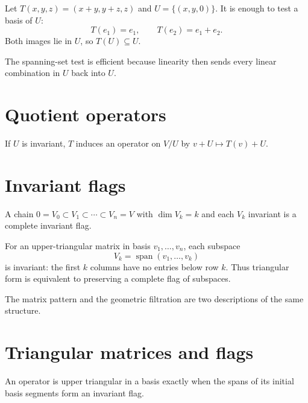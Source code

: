 \begin{example}\label{ex:i10-expand-01}
Let \(T(x,y,z)=(x+y,y+z,z)\) and
\(U=\{(x,y,0)\}\). It is enough to test a basis of \(U\):
\[
T(e_1)=e_1,\qquad T(e_2)=e_1+e_2.
\]
Both images lie in \(U\), so \(T(U)\subseteq U\).

The spanning-set test is efficient because linearity then sends every linear
combination in \(U\) back into \(U\).
\end{example}
\section{Quotient operators}
If $U$ is invariant, $T$ induces an operator on $V/U$ by $v+U\mapsto T(v)+U$.

\section{Invariant flags}
A chain $0=V_0\subset V_1\subset\cdots\subset V_n=V$ with $\dim V_k=k$ and each $V_k$ invariant is a complete invariant flag.


\begin{example}\label{ex:i10-expand-03}
For an upper-triangular matrix in basis \(v_1,\ldots,v_n\), each subspace
\[
V_k=\operatorname{span}(v_1,\ldots,v_k)
\]
is invariant: the first \(k\) columns have no entries below row \(k\).
Thus triangular form is equivalent to preserving a complete flag of subspaces.

The matrix pattern and the geometric filtration are two descriptions of the
same structure.
\end{example}
\section{Triangular matrices and flags}
An operator is upper triangular in a basis exactly when the spans of its initial basis segments form an invariant flag.


